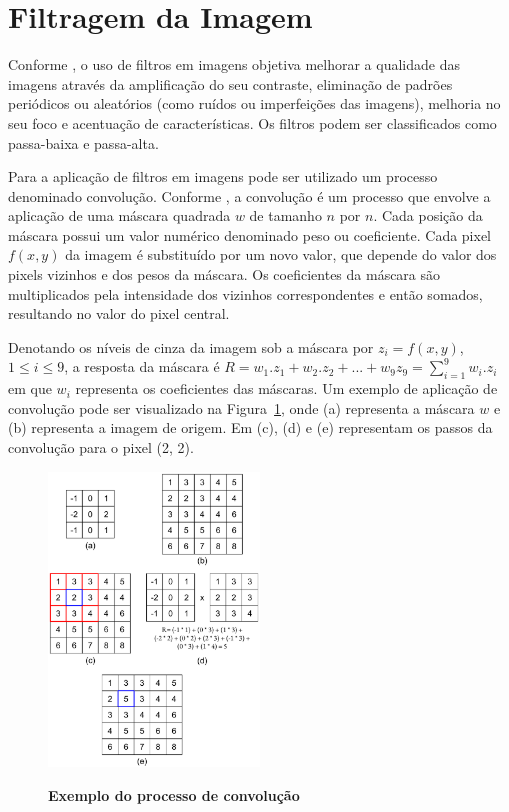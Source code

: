 \documentclass[12pt,oneside,a4paper,english,french,spanish,brazil,]{abntex2}
\begin{document}
\section{Filtragem da Imagem}

Conforme \citet{conci:2003}, o uso de filtros em imagens objetiva melhorar a qualidade das imagens através da amplificação do seu contraste, eliminação de padrões periódicos ou aleatórios (como ruídos ou imperfeições das imagens), melhoria no seu foco e acentuação de características. Os filtros podem ser classificados como passa-baixa e passa-alta.
	
Para a aplicação de filtros em imagens pode ser utilizado um processo denominado convolução. Conforme \cite{pedrini:2008}, a convolução é um processo que envolve a aplicação de uma máscara quadrada \(w\) de tamanho \(n\) por \(n\). Cada posição da máscara possui um valor numérico denominado peso ou coeficiente. Cada pixel \(f(x,y)\) da imagem é substituído por um novo valor, que depende do valor dos pixels vizinhos e dos pesos da máscara. Os coeficientes da máscara são multiplicados pela intensidade dos vizinhos correspondentes e então somados, resultando no valor do pixel central.


Denotando os níveis de cinza da imagem sob a máscara por \(z_i=f(x,y)\), \(1\leq i\leq 9\), a resposta da máscara é \(R=w_1.z_1+w_2.z_2+...+w_9z_9 = \sum_{i=1}^{9}w_i.z_i\) em que \(w_i\) representa os coeficientes das máscaras. Um exemplo de aplicação de convolução pode ser visualizado na Figura~\ref{fig:PDI_Convolucao}, onde (a) representa a máscara \(w\) e (b) representa a imagem de origem. Em (c), (d) e (e) representam os passos da convolução para o pixel (2, 2).
	
\begin{figure}[ht]
\centering
\caption{\textbf{Exemplo do processo de convolução}}
\includegraphics[width=0.5\textwidth]{imagens/PDI_Convolucao.pdf}
\sourceAuthor
\label{fig:PDI_Convolucao}
\end{figure}
\end{document}
